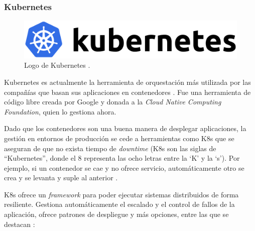 \subsubsection*{Kubernetes}

\begin{figure}[H]
    \centering
    \includegraphics[width=\linewidth]{pictures/kubernetes-logo.png}
    \caption{Logo de Kubernetes \autocite{ArchivoKubernetesLogo}.}
    \label{fig:k8s-logo}
\end{figure}
Kubernetes es actualmente la herramienta de orquestación más utilizada por las
compañías que basan sus aplicaciones en contenedores \autocite{ContainerAdoptionTrends}.
Fue una herramienta de código libre creada por Google y donada a la \textit{Cloud Native Computing
Foundation}, quien lo gestiona ahora.

Dado que los contenedores son una buena manera de desplegar aplicaciones, la gestión
en entornos de producción se cede a herramientas como K8s que se aseguran de que
no exista tiempo de \textit{downtime} (K8s son las siglas de ``Kubernetes'', donde
el 8 representa las ocho letras entre la `K' y la `s'). Por ejemplo, si un
contenedor se cae y no ofrece servicio, automáticamente otro se crea y se levanta
y suple al anterior \autocite{WhatKubernetes}.

K8s ofrece un \textit{framework} para poder ejecutar sistemas distribuidos de
forma resiliente. Gestiona automáticamente el escalado y el control de fallos
de la aplicación, ofrece patrones de despliegue y más opciones, entre las
que se destacan \autocite{WhatKubernetes}:

